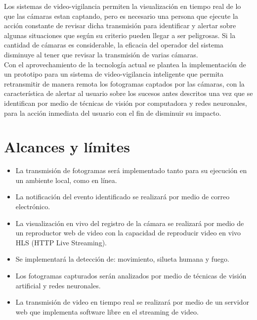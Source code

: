 Los sistemas de video-vigilancia permiten la visualización en tiempo real de lo que las cámaras estan captando, pero es necesario una persona que ejecute la acción constante de revisar dicha transmisión para identificar y alertar sobre algunas situaciones que según su criterio pueden llegar a ser peligrosas. Si la cantidad de cámaras es considerable, la eficacia del operador del sistema disminuye al tener que revisar la transmisión de varias cámaras.\\

Con el aprovechamiento de la tecnología actual se plantea la implementación de un prototipo para un sistema de video-vigilancia inteligente que permita retransmitir de manera remota los fotogramas captados por las cámaras, con la característica de alertar al usuario sobre los sucesos antes descritos una vez que se identifican por medio de técnicas de visión por computadora y redes neuronales, para la acción inmediata del usuario con el fin de disminuir su impacto.\\

\section{Alcances y límites}
\begin{itemize}
    \item La transmisión de fotogramas será implementado tanto para su ejecución en un ambiente local, como en línea.
    \item La notificación del evento identificado se realizará por medio de correo electrónico.
    \item La visualización en vivo del registro de la cámara se realizará por medio de un reproductor web de video con la capacidad de reproducir video en vivo HLS (HTTP Live Streaming).
    \item Se implementará la detección de: movimiento, silueta humana y fuego.
    \item Los fotogramas capturados serán analizados por medio de técnicas de visión artificial y redes neuronales.
    \item La transmisión de video en tiempo real se realizará por medio de un servidor web que implementa software libre en el streaming de video.
\end{itemize}